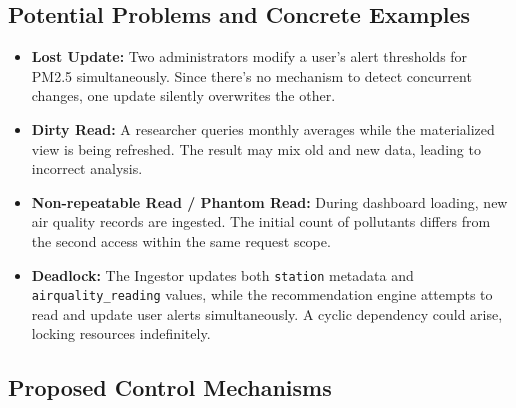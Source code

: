 \subsection{Potential Problems and Concrete Examples}

\begin{itemize}
    \item \textbf{Lost Update:} Two administrators modify a user's alert thresholds for PM2.5 simultaneously. Since there's no mechanism to detect concurrent changes, one update silently overwrites the other.
    
    \item \textbf{Dirty Read:} A researcher queries monthly averages while the materialized view is being refreshed. The result may mix old and new data, leading to incorrect analysis.
    
    \item \textbf{Non-repeatable Read / Phantom Read:} During dashboard loading, new air quality records are ingested. The initial count of pollutants differs from the second access within the same request scope.
    
    \item \textbf{Deadlock:} The Ingestor updates both \texttt{station} metadata and \texttt{airquality\_reading} values, while the recommendation engine attempts to read and update user alerts simultaneously. A cyclic dependency could arise, locking resources indefinitely.
\end{itemize}

\subsection{Proposed Control Mechanisms}

